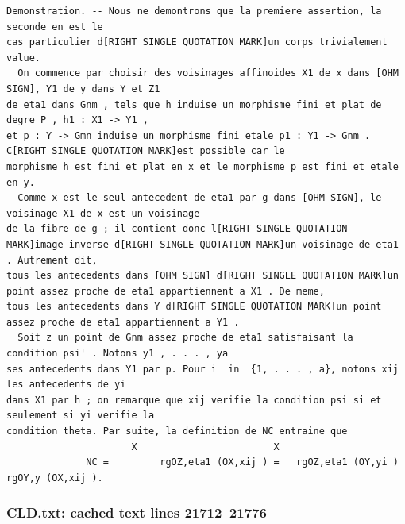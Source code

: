 \documentclass[
  11pt,
]{article}
\begin{document}
\begin{lstlisting}
Demonstration. -- Nous ne demontrons que la premiere assertion, la seconde en est le
cas particulier d[RIGHT SINGLE QUOTATION MARK]un corps trivialement value.
  On commence par choisir des voisinages affinoides X1 de x dans [OHM SIGN], Y1 de y dans Y et Z1
de eta1 dans Gnm , tels que h induise un morphisme fini et plat de degre P , h1 : X1 -> Y1 ,
et p : Y -> Gmn induise un morphisme fini etale p1 : Y1 -> Gnm . C[RIGHT SINGLE QUOTATION MARK]est possible car le
morphisme h est fini et plat en x et le morphisme p est fini et etale en y.
  Comme x est le seul antecedent de eta1 par g dans [OHM SIGN], le voisinage X1 de x est un voisinage
de la fibre de g ; il contient donc l[RIGHT SINGLE QUOTATION MARK]image inverse d[RIGHT SINGLE QUOTATION MARK]un voisinage de eta1 . Autrement dit,
tous les antecedents dans [OHM SIGN] d[RIGHT SINGLE QUOTATION MARK]un point assez proche de eta1 appartiennent a X1 . De meme,
tous les antecedents dans Y d[RIGHT SINGLE QUOTATION MARK]un point assez proche de eta1 appartiennent a Y1 .
  Soit z un point de Gnm assez proche de eta1 satisfaisant la condition psi' . Notons y1 , . . . , ya
ses antecedents dans Y1 par p. Pour i  in  {1, . . . , a}, notons xij les antecedents de yi
dans X1 par h ; on remarque que xij verifie la condition psi si et seulement si yi verifie la
condition theta. Par suite, la definition de NC entraine que
                      X                        X
              NC =         rgOZ,eta1 (OX,xij ) =   rgOZ,eta1 (OY,yi ) rgOY,y (OX,xij ).
\end{lstlisting}

\subsubsection{CLD.txt: cached text lines
21712--21776}\label{cld.txt-cached-text-lines-2171221776}
\end{document}
